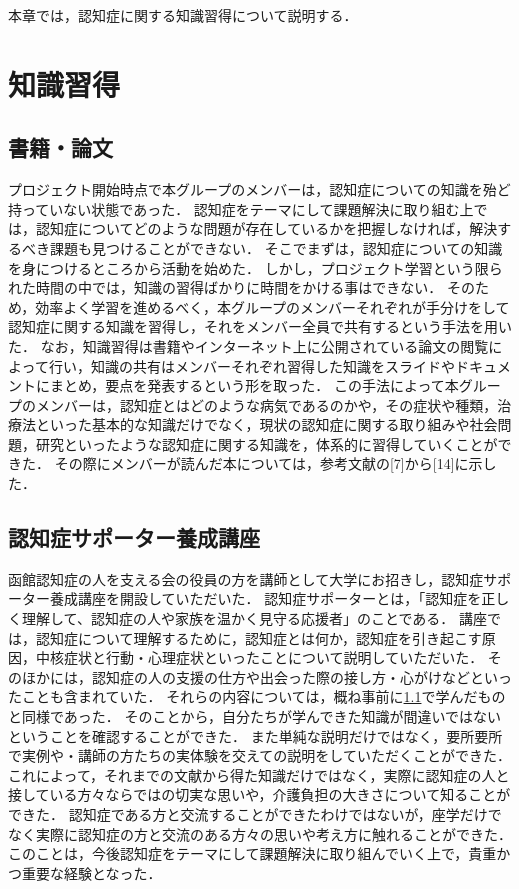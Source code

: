 \documentclass[../report]{subfiles}
\begin{document}
本章では，認知症に関する知識習得について説明する．


\section{知識習得}
\subsection{書籍・論文} \label{sec:document-article}
プロジェクト開始時点で本グループのメンバーは，認知症についての知識を殆ど持っていない状態であった．
認知症をテーマにして課題解決に取り組む上では，認知症についてどのような問題が存在しているかを把握しなければ，解決するべき課題も見つけることができない．
そこでまずは，認知症についての知識を身につけるところから活動を始めた．
しかし，プロジェクト学習という限られた時間の中では，知識の習得ばかりに時間をかける事はできない．
そのため，効率よく学習を進めるべく，本グループのメンバーそれぞれが手分けをして認知症に関する知識を習得し，それをメンバー全員で共有するという手法を用いた．
なお，知識習得は書籍やインターネット上に公開されている論文の閲覧によって行い，知識の共有はメンバーそれぞれ習得した知識をスライドやドキュメントにまとめ，要点を発表するという形を取った．
この手法によって本グループのメンバーは，認知症とはどのような病気であるのかや，その症状や種類，治療法といった基本的な知識だけでなく，現状の認知症に関する取り組みや社会問題，研究といったような認知症に関する知識を，体系的に習得していくことができた．
その際にメンバーが読んだ本については，参考文献の[7]から[14]に示した．

\subsection{認知症サポーター養成講座}
函館認知症の人を支える会の役員の方を講師として大学にお招きし，認知症サポーター養成講座を開設していただいた．
認知症サポーターとは，「認知症を正しく理解して、認知症の人や家族を温かく見守る応援者」のことである．
講座では，認知症について理解するために，認知症とは何か，認知症を引き起こす原因，中核症状と行動・心理症状といったことについて説明していただいた．
そのほかには，認知症の人の支援の仕方や出会った際の接し方・心がけなどといったことも含まれていた．
それらの内容については，概ね事前に\ref{sec:document-article}で学んだものと同様であった．
そのことから，自分たちが学んできた知識が間違いではないということを確認することができた．
また単純な説明だけではなく，要所要所で実例や・講師の方たちの実体験を交えての説明をしていただくことができた．
これによって，それまでの文献から得た知識だけではなく，実際に認知症の人と接している方々ならではの切実な思いや，介護負担の大きさについて知ることができた．
認知症である方と交流することができたわけではないが，座学だけでなく実際に認知症の方と交流のある方々の思いや考え方に触れることができた．
このことは，今後認知症をテーマにして課題解決に取り組んでいく上で，貴重かつ重要な経験となった．
\end{document}
